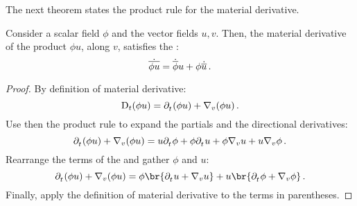 The next theorem states the product rule for the material derivative.
%
\begin{theorem}
  Consider a scalar field $\phi$ and the vector fields $u,v$. Then, the material derivative of the product $\phi u$, along $v$, satisfies the :
  \begin{equation}\label{eqn:product-rule-material-derivative}
    \dot{\overline{\phi u}} = \dot{\overline{\phi}} u + \phi\dot{\overline{u}}\,.
  \end{equation}
\end{theorem}
%
\begin{proof}
  By definition of material derivative:
  \begin{equation*}
    \omdt t\vat{\phi u} = \cpd t\vat{\phi u} + \ocder v\vat{\phi u}\,.
  \end{equation*}
  Use then the product rule to expand the partials and the directional derivatives:
  \begin{equation*}
    \cpd t\vat{\phi u} + \ocder v\vat{\phi u}
    =
    u\cpd t\phi + \phi\cpd tu + \phi\ocder vu + u\ocder v\phi\,.
  \end{equation*}
  Rearrange the terms of the  and gather $\phi$ and $u$:
  \begin{equation*}
    \cpd t\vat{\phi u} + \ocder v\vat{\phi u}
    =
    \phi\br{\cpd tu + \ocder vu} + u\br{\cpd t\phi + \ocder v\phi}\,.
  \end{equation*}
  Finally, apply the definition of material derivative to the terms in parentheses.
\end{proof}

